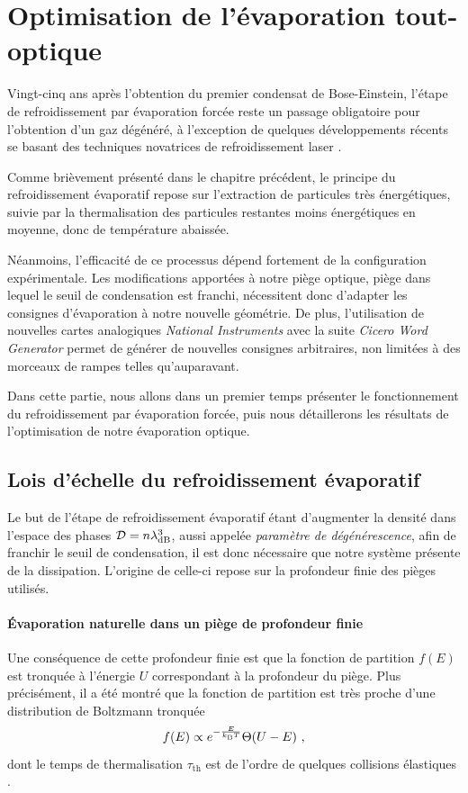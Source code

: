 \section{Optimisation de l'évaporation tout-optique}
\label{sc:evap_optique}
Vingt-cinq ans après l'obtention du premier condensat de Bose-Einstein, l'étape de refroidissement par évaporation forcée reste un passage obligatoire pour l'obtention d'un gaz dégénéré, à l'exception de quelques développements récents se basant des techniques novatrices de refroidissement laser \citep{stellmer2013laser} \citep{hu2017creation}. 

Comme brièvement présenté dans le chapitre précédent, le principe du refroidissement évaporatif repose sur l'extraction de particules très énergétiques, suivie par la thermalisation des particules restantes moins énergétiques en moyenne, donc de température abaissée.

Néanmoins, l'efficacité de ce processus dépend fortement de la configuration expérimentale. Les modifications apportées à notre piège optique, piège dans lequel le seuil de condensation est franchi, nécessitent donc d'adapter les consignes d'évaporation à notre nouvelle géométrie. De plus, l'utilisation de nouvelles cartes analogiques \emph{National Instruments} avec la suite \emph{Cicero Word Generator} permet de générer de nouvelles consignes arbitraires, non limitées à des morceaux de rampes telles qu'auparavant. 

Dans cette partie, nous allons dans un premier temps présenter le fonctionnement du refroidissement par évaporation forcée, puis nous détaillerons les résultats de l'optimisation de notre évaporation optique.


\subsection{Lois d'échelle du refroidissement évaporatif}
\label{sc:scaling_laws_ohara}
Le but de l'étape de refroidissement évaporatif étant d'augmenter la densité dans l'espace des phases $\mathcal{D}=n \lambda_{\mathrm{dB}}^3$, aussi appelée \emph{paramètre de dégénérescence}, afin de franchir le seuil de condensation, il est donc nécessaire que notre système présente de la dissipation. L'origine de celle-ci repose sur la profondeur finie des pièges utilisés.  

\paragraph*{Évaporation naturelle dans un piège de profondeur finie}
Une conséquence de cette profondeur finie est que la fonction de partition $f(E)$ est tronquée à l'énergie $U$ correspondant à la profondeur du piège. Plus précisément, il a été montré que la fonction de partition est très proche d'une distribution de Boltzmann tronquée
\begin{equation}
f(E)\propto e^{-\frac{E}{k_{\mathrm{B}} T}} \Theta(U-E) \text{ ,}
\label{eq:fonction_partition}
\end{equation}
dont le temps de thermalisation $\tau_{\mathrm{th}}$ est de l'ordre de quelques collisions élastiques \citep{luiten1996kinetic}. 


